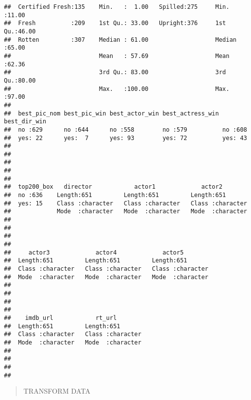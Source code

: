 \documentclass[]{article}
\begin{document}
\begin{verbatim}
##  Certified Fresh:135    Min.   :  1.00   Spilled:275     Min.   :11.00  
##  Fresh          :209    1st Qu.: 33.00   Upright:376     1st Qu.:46.00  
##  Rotten         :307    Median : 61.00                   Median :65.00  
##                         Mean   : 57.69                   Mean   :62.36  
##                         3rd Qu.: 83.00                   3rd Qu.:80.00  
##                         Max.   :100.00                   Max.   :97.00  
##                                                                         
##  best_pic_nom best_pic_win best_actor_win best_actress_win best_dir_win
##  no :629      no :644      no :558        no :579          no :608     
##  yes: 22      yes:  7      yes: 93        yes: 72          yes: 43     
##                                                                        
##                                                                        
##                                                                        
##                                                                        
##                                                                        
##  top200_box   director            actor1             actor2         
##  no :636    Length:651         Length:651         Length:651        
##  yes: 15    Class :character   Class :character   Class :character  
##             Mode  :character   Mode  :character   Mode  :character  
##                                                                     
##                                                                     
##                                                                     
##                                                                     
##     actor3             actor4             actor5         
##  Length:651         Length:651         Length:651        
##  Class :character   Class :character   Class :character  
##  Mode  :character   Mode  :character   Mode  :character  
##                                                          
##                                                          
##                                                          
##                                                          
##    imdb_url            rt_url         
##  Length:651         Length:651        
##  Class :character   Class :character  
##  Mode  :character   Mode  :character  
##                                       
##                                       
##                                       
## 
\end{verbatim}

\begin{quote}
TRANSFORM DATA
\end{quote}
\end{document}
